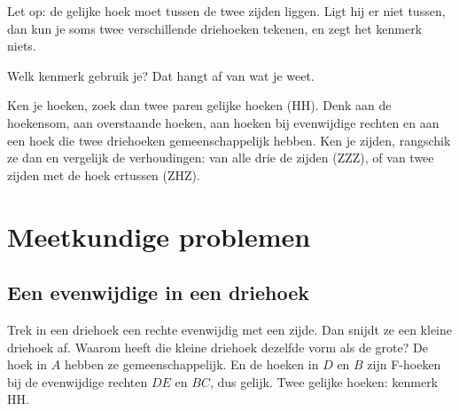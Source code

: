 Let op: de gelijke hoek moet tussen de twee zijden liggen. Ligt hij er niet tussen, dan kun je soms twee verschillende driehoeken tekenen, en zegt het kenmerk niets.


Welk kenmerk gebruik je? Dat hangt af van wat je weet.

\begin{werkwijze}
Ken je hoeken, zoek dan twee paren gelijke hoeken (HH). Denk aan de hoekensom, aan overstaande hoeken, aan hoeken bij evenwijdige rechten en aan een hoek die twee driehoeken gemeenschappelijk hebben. Ken je zijden, rangschik ze dan en vergelijk de verhoudingen: van alle drie de zijden (ZZZ), of van twee zijden met de hoek ertussen (ZHZ).
\end{werkwijze}

\begin{oefeningen}
\end{oefeningen}

\section{Meetkundige problemen}

\subsection{Een evenwijdige in een driehoek}

Trek in een driehoek een rechte evenwijdig met een zijde. Dan snijdt ze een kleine driehoek af. Waarom heeft die kleine driehoek dezelfde vorm als de grote? De hoek in $A$ hebben ze gemeenschappelijk. En de hoeken in $D$ en $B$ zijn F-hoeken bij de evenwijdige rechten $DE$ en $BC$, dus gelijk. Twee gelijke hoeken: kenmerk HH.

